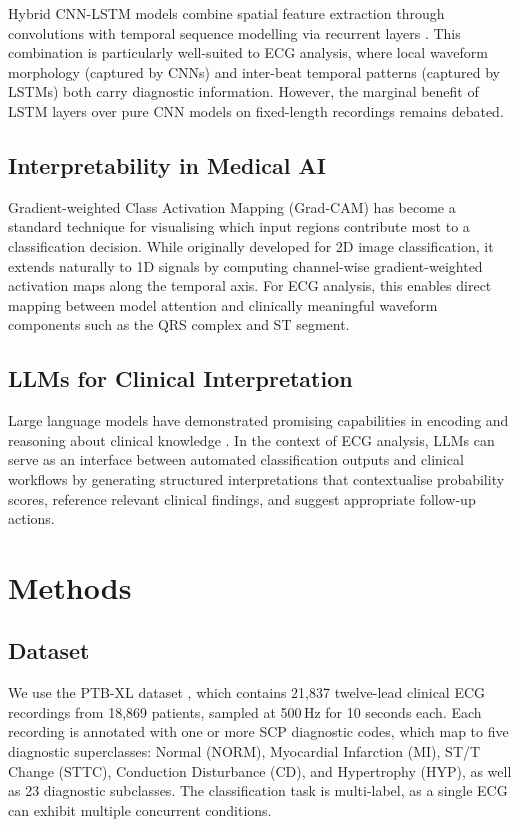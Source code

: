 \documentclass[10pt]{article}
\begin{document}
Hybrid CNN-LSTM models combine spatial feature extraction through convolutions with temporal sequence modelling via recurrent layers \citep{hochreiter1997lstm}. This combination is particularly well-suited to ECG analysis, where local waveform morphology (captured by CNNs) and inter-beat temporal patterns (captured by LSTMs) both carry diagnostic information. However, the marginal benefit of LSTM layers over pure CNN models on fixed-length recordings remains debated.

\subsection{Interpretability in Medical AI}

Gradient-weighted Class Activation Mapping (Grad-CAM) \citep{selvaraju2017gradcam} has become a standard technique for visualising which input regions contribute most to a classification decision. While originally developed for 2D image classification, it extends naturally to 1D signals by computing channel-wise gradient-weighted activation maps along the temporal axis. For ECG analysis, this enables direct mapping between model attention and clinically meaningful waveform components such as the QRS complex and ST segment.

\subsection{LLMs for Clinical Interpretation}

Large language models have demonstrated promising capabilities in encoding and reasoning about clinical knowledge \citep{singhal2023medical}. In the context of ECG analysis, LLMs can serve as an interface between automated classification outputs and clinical workflows by generating structured interpretations that contextualise probability scores, reference relevant clinical findings, and suggest appropriate follow-up actions.

\section{Methods}

\subsection{Dataset}

We use the PTB-XL dataset \citep{wagner2020ptbxl}, which contains 21,837 twelve-lead clinical ECG recordings from 18,869 patients, sampled at 500\,Hz for 10 seconds each. Each recording is annotated with one or more SCP diagnostic codes, which map to five diagnostic superclasses: Normal (NORM), Myocardial Infarction (MI), ST/T Change (STTC), Conduction Disturbance (CD), and Hypertrophy (HYP), as well as 23 diagnostic subclasses. The classification task is multi-label, as a single ECG can exhibit multiple concurrent conditions.
\end{document}
